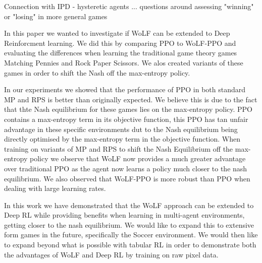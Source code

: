 \documentclass[conference]{IEEEtran}
\begin{document}
Connection with IPD - hysteretic agents ... questions around assessing "winning" or "losing" in more general games

In this paper we wanted to investigate if WoLF can be extended to Deep Reinforcment learning. We did this by comparing PPO to WoLF-PPO and evaluating the differences when learning the traditional game theory games Matching Pennies and Rock Paper Scissors. We alos created variants of these games in order to shift the Nash off the max-entropy policy.

In our experiments we showed that the performance of PPO in both standard MP and RPS is better than originally expected. We believe this is due to the fact that thte Nash equilibrium for these games lies on the max-entropy policy. PPO contains a max-entropy term in its objective function, this PPO has tan unfair advantage in these specific environments dut to the Nash equilibrium being directly optimised by the max-entropy term in the objective function. When training on variants of MP and RPS to shift the Nash Equilibrium off the max-entropy policy we observe that WoLF now provides a much greater advantage over traditional PPO as the agent now learns a policy much closer to the nash equilibrium. We also observed that WoLF-PPO is more robust than PPO when dealing with large learning rates.

In this work we have demonstrated that the WoLF approach can be extended to Deep RL while providing benefits when learning in multi-agent environments, getting closer to the nash equilibrium. We would like to expand this to extensive form games in the future, specifically the Soccer environment. We would then like to expand beyond what is possible with tabular RL in order to demonstrate both the advantages of WoLF and Deep RL by training on raw pixel data.
\end{document}
